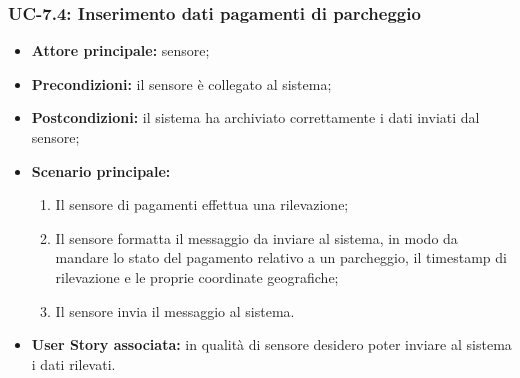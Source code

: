 \documentclass[8pt]{article}
\begin{document}
\subsubsection*{UC-7.4: Inserimento dati pagamenti di parcheggio}
\begin{itemize}
    \item \textbf{Attore principale:} sensore;
    \item \textbf{Precondizioni:} il sensore è collegato al sistema;
    \item \textbf{Postcondizioni:} il sistema ha archiviato correttamente i dati inviati dal sensore;
    \item \textbf{Scenario principale:}
        \begin{enumerate}
        \item Il sensore di pagamenti effettua una rilevazione;
        \item Il sensore formatta il messaggio da inviare al sistema, in modo da mandare lo stato
            del pagamento relativo a un parcheggio, il timestamp di rilevazione e le proprie
coordinate geografiche;
        \item Il sensore invia il messaggio al sistema.
        \end{enumerate}
    \item \textbf{User Story associata:} in qualità di sensore desidero poter inviare al sistema i
        dati rilevati.
\end{itemize}
\end{document}
